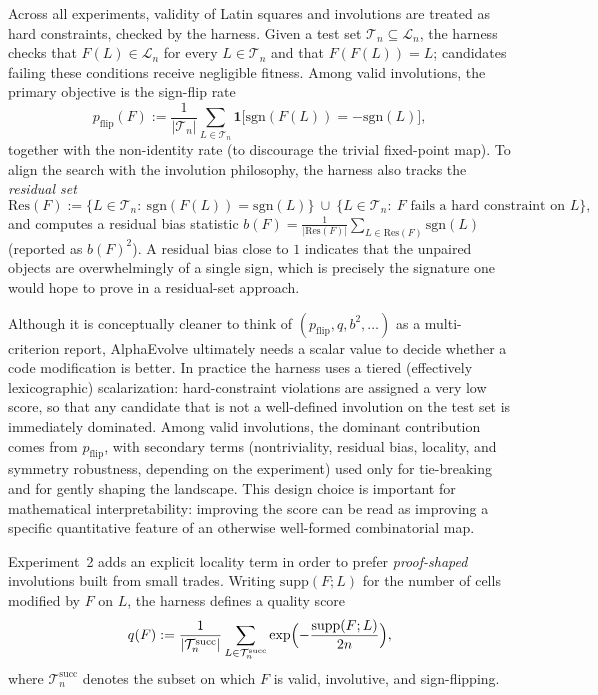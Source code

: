 \documentclass[11pt]{amsart}
\newcommand{\sgn}{\mathrm{sgn}}
\newcommand{\Res}{\mathrm{Res}}
\begin{document}
Across all experiments, validity of Latin squares and involutions are treated as hard constraints, checked by the harness.
Given a test set $\mathcal{T}_n\subseteq\mathcal{L}_n$, the harness checks that $F(L)\in\mathcal{L}_n$ for every $L\in\mathcal{T}_n$ and that $F(F(L))=L$; candidates failing these conditions receive negligible fitness.
Among valid involutions, the primary objective is the sign-flip rate
\[
p_{\mathrm{flip}}(F):=\frac{1}{|\mathcal{T}_n|}\sum_{L\in\mathcal{T}_n}\mathbf{1}\bigl[\sgn(F(L))=-\sgn(L)\bigr],
\]
together with the non-identity rate (to discourage the trivial fixed-point map).
To align the search with the involution philosophy, the harness also tracks the \emph{residual set}
\[
\Res(F):=\{L\in\mathcal{T}_n:\ \sgn(F(L))=\sgn(L)\}\ \cup\ \{L\in\mathcal{T}_n:\ F \text{ fails a hard constraint on }L\},
\]
and computes a residual bias statistic $b(F)=\frac{1}{|\Res(F)|}\sum_{L\in\Res(F)}\sgn(L)$ (reported as $b(F)^2$).
A residual bias close to $1$ indicates that the unpaired objects are overwhelmingly of a single sign, which is precisely the signature one would hope to prove in a residual-set approach.

Although it is conceptually cleaner to think of $(p_{\mathrm{flip}},q,b^2,\dots)$ as a multi-criterion report, AlphaEvolve ultimately needs a scalar value to decide whether a code modification is better.
In practice the harness uses a tiered (effectively lexicographic) scalarization: hard-constraint violations are assigned a very low score, so that any candidate that is not a well-defined involution on the test set is immediately dominated.
Among valid involutions, the dominant contribution comes from $p_{\mathrm{flip}}$, with secondary terms (nontriviality, residual bias, locality, and symmetry robustness, depending on the experiment) used only for tie-breaking and for gently shaping the landscape.
This design choice is important for mathematical interpretability: improving the score can be read as improving a specific quantitative feature of an otherwise well-formed combinatorial map.


Experiment~2 adds an explicit locality term in order to prefer \emph{proof-shaped} involutions built from small trades.
Writing $\mathrm{supp}(F;L)$ for the number of cells modified by $F$ on $L$, the harness defines a quality score
\[
q(F):=\frac{1}{|\mathcal{T}_n^{\mathrm{succ}}|}\sum_{L\in\mathcal{T}_n^{\mathrm{succ}}}\exp \Bigl(-\frac{\mathrm{supp}(F;L)}{2n}\Bigr),
\]
where $\mathcal{T}_n^{\mathrm{succ}}$ denotes the subset on which $F$ is valid, involutive, and sign-flipping.
\end{document}
